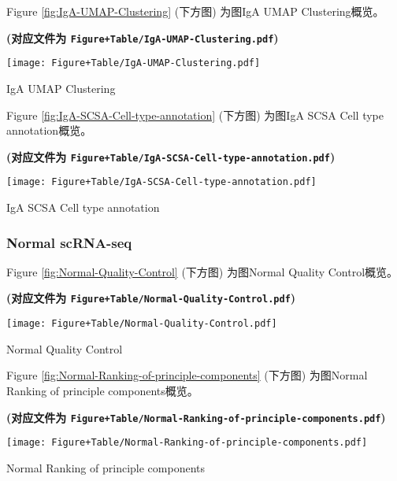 \documentclass[
]{article}
\begin{document}
Figure \ref{fig:IgA-UMAP-Clustering} (下方图) 为图IgA UMAP Clustering概览。

\textbf{(对应文件为 \texttt{Figure+Table/IgA-UMAP-Clustering.pdf})}

\def\@captype{figure}
\begin{center}
\texttt{[image: Figure+Table/IgA-UMAP-Clustering.pdf]}
\caption{IgA UMAP Clustering}\label{fig:IgA-UMAP-Clustering}
\end{center}

Figure \ref{fig:IgA-SCSA-Cell-type-annotation} (下方图) 为图IgA SCSA Cell type annotation概览。

\textbf{(对应文件为 \texttt{Figure+Table/IgA-SCSA-Cell-type-annotation.pdf})}

\def\@captype{figure}
\begin{center}
\texttt{[image: Figure+Table/IgA-SCSA-Cell-type-annotation.pdf]}
\caption{IgA SCSA Cell type annotation}\label{fig:IgA-SCSA-Cell-type-annotation}
\end{center}

\hypertarget{normal-scrna-seq}{%
\subsubsection{Normal scRNA-seq}\label{normal-scrna-seq}}

Figure \ref{fig:Normal-Quality-Control} (下方图) 为图Normal Quality Control概览。

\textbf{(对应文件为 \texttt{Figure+Table/Normal-Quality-Control.pdf})}

\def\@captype{figure}
\begin{center}
\texttt{[image: Figure+Table/Normal-Quality-Control.pdf]}
\caption{Normal Quality Control}\label{fig:Normal-Quality-Control}
\end{center}

Figure \ref{fig:Normal-Ranking-of-principle-components} (下方图) 为图Normal Ranking of principle components概览。

\textbf{(对应文件为 \texttt{Figure+Table/Normal-Ranking-of-principle-components.pdf})}

\def\@captype{figure}
\begin{center}
\texttt{[image: Figure+Table/Normal-Ranking-of-principle-components.pdf]}
\caption{Normal Ranking of principle components}\label{fig:Normal-Ranking-of-principle-components}
\end{center}
\end{document}
